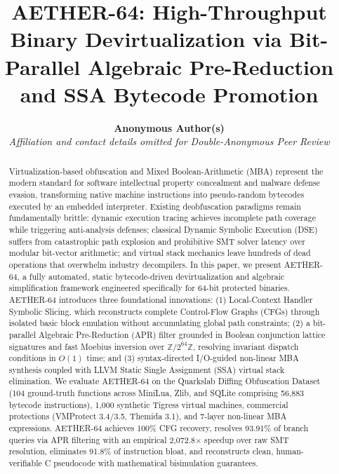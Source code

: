 \documentclass[11pt,a4paper]{article}
\begin{document}
\title{\textbf{AETHER-64: High-Throughput Binary Devirtualization via Bit-Parallel Algebraic Pre-Reduction and SSA Bytecode Promotion}}

\author{
  \textbf{Anonymous Author(s)} \\
  \textit{Affiliation and contact details omitted for Double-Anonymous Peer Review}
}

\date{}

\maketitle

\begin{abstract}
Virtualization-based obfuscation and Mixed Boolean-Arithmetic (MBA) represent the modern standard for software intellectual property concealment and malware defense evasion, transforming native machine instructions into pseudo-random bytecodes executed by an embedded interpreter. Existing deobfuscation paradigms remain fundamentally brittle: dynamic execution tracing achieves incomplete path coverage while triggering anti-analysis defenses; classical Dynamic Symbolic Execution (DSE) suffers from catastrophic path explosion and prohibitive SMT solver latency over modular bit-vector arithmetic; and virtual stack mechanics leave hundreds of dead operations that overwhelm industry decompilers. In this paper, we present AETHER-64, a fully automated, static bytecode-driven devirtualization and algebraic simplification framework engineered specifically for 64-bit protected binaries. AETHER-64 introduces three foundational innovations: (1) Local-Context Handler Symbolic Slicing, which reconstructs complete Control-Flow Graphs (CFGs) through isolated basic block emulation without accumulating global path constraints; (2) a bit-parallel Algebraic Pre-Reduction (APR) filter grounded in Boolean conjunction lattice signatures and fast Moebius inversion over $\mathbb{Z}/2^{64}\mathbb{Z}$, resolving invariant dispatch conditions in $O(1)$ time; and (3) syntax-directed I/O-guided non-linear MBA synthesis coupled with LLVM Static Single Assignment (SSA) virtual stack elimination. We evaluate AETHER-64 on the Quarkslab Diffing Obfuscation Dataset (104 ground-truth functions across MiniLua, Zlib, and SQLite comprising 56,883 bytecode instructions), 1,000 synthetic Tigress virtual machines, commercial protections (VMProtect 3.4/3.5, Themida 3.1), and 7-layer non-linear MBA expressions. AETHER-64 achieves 100\% CFG recovery, resolves 93.91\% of branch queries via APR filtering with an empirical 2,072.8$\times$ speedup over raw SMT resolution, eliminates 91.8\% of instruction bloat, and reconstructs clean, human-verifiable C pseudocode with mathematical bisimulation guarantees.
\end{abstract}
\end{document}
